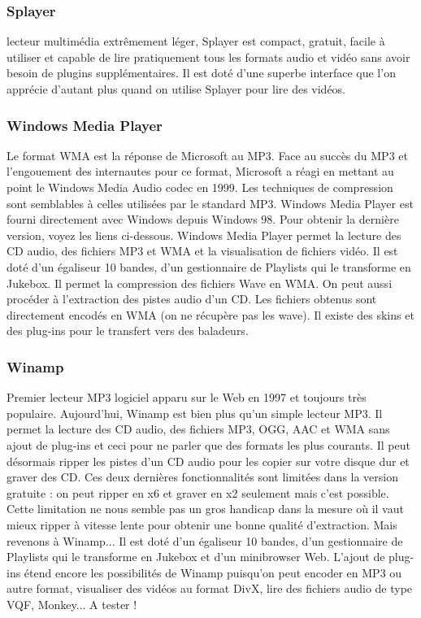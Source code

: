 \documentclass{report}
\begin{document}
\subsubsection{Splayer}

lecteur multimédia extrêmement léger, Splayer est compact, gratuit, facile à utiliser et capable de lire pratiquement tous les formats audio et vidéo sans avoir besoin de plugins supplémentaires. Il est doté d'une superbe interface que l'on apprécie d'autant plus quand on utilise Splayer pour lire des vidéos. 

\subsubsection{Windows Media Player}

Le format WMA est la réponse de Microsoft au MP3. Face au succès du MP3 et l'engouement des internautes pour ce format, Microsoft a réagi en mettant au point le Windows Media Audio codec en 1999. Les techniques de compression sont semblables à celles utilisées par le standard MP3. Windows Media Player est fourni directement avec Windows depuis Windows 98. Pour obtenir la dernière version, voyez les liens ci-dessous. Windows Media Player permet la lecture des CD audio, des fichiers MP3 et WMA et la visualisation de fichiers vidéo. Il est doté d'un égaliseur 10 bandes, d'un gestionnaire de Playlists qui le transforme en Jukebox. Il permet la compression des fichiers Wave en WMA. On peut aussi procéder à l'extraction des pistes audio d'un CD. Les fichiers obtenus sont directement encodés en WMA (on ne récupère pas les wave). Il existe des skins et des plug-ins pour le transfert vers des baladeurs.

\subsubsection{Winamp}

Premier lecteur MP3 logiciel apparu sur le Web en 1997 et toujours très populaire. Aujourd'hui, Winamp est bien plus qu'un simple lecteur MP3. Il permet la lecture des CD audio, des fichiers MP3, OGG, AAC et WMA sans ajout de plug-ins et ceci pour ne parler que des formats les plus courants. Il peut désormais ripper les pistes d'un CD audio pour les copier sur votre disque dur et graver des CD. Ces deux dernières fonctionnalités sont limitées dans la version gratuite : on peut ripper en x6 et graver en x2 seulement mais c'est possible. Cette limitation ne nous semble pas un gros handicap dans la mesure o\`u il vaut mieux ripper \`a  vitesse lente pour obtenir une bonne qualité d'extraction. Mais revenons \`a  Winamp... Il est doté d'un égaliseur 10 bandes, d'un gestionnaire de Playlists qui le transforme en Jukebox et d'un minibrowser Web. 
L'ajout de plug-ins étend encore les possibilités de Winamp puisqu'on peut encoder en MP3 ou autre format, visualiser des vidéos au format DivX, lire des fichiers audio de type VQF, Monkey... A tester !
\end{document}
